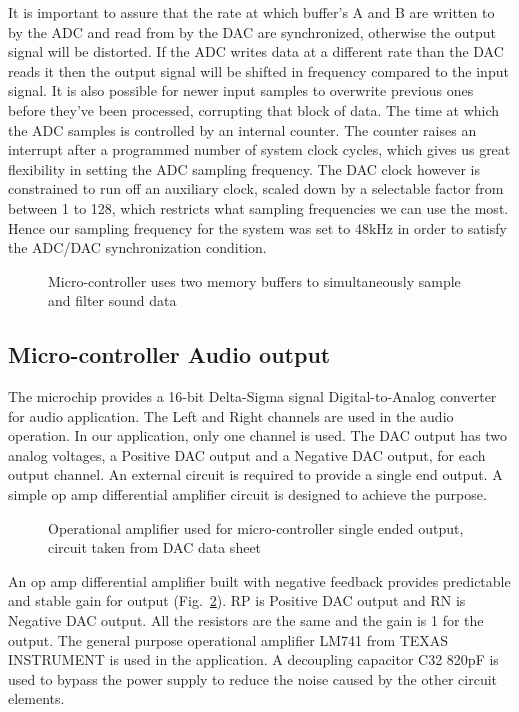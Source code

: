 It is important to assure that the rate at which buffer's A and B are written to by the ADC and read from by the DAC are synchronized, otherwise the output signal will be distorted. If the ADC writes data at a different rate than the DAC reads it then the output signal will be shifted in frequency compared to the input signal. It is also possible for newer input samples to overwrite previous ones before they've been processed, corrupting that block of data. The time at which the ADC samples is controlled by an internal counter. The counter raises an interrupt after a programmed number of system clock cycles, which gives us great flexibility in setting the ADC sampling frequency. The DAC clock however is constrained to run off an auxiliary clock, scaled down by a selectable factor from between 1 to 128, which restricts what sampling frequencies we can use the most. Hence our sampling frequency for the system was set to 48kHz in order to satisfy the ADC/DAC synchronization condition.

\begin{figure}[!htb]
	\centering
	\caption{Micro-controller uses two memory buffers to simultaneously sample and filter sound data}
	\label{fig:mcu_operation}
\end{figure}



\subsection{Micro-controller Audio output}
The microchip provides a 16-bit Delta-Sigma signal Digital-to-Analog converter for audio application.  The Left and Right channels are used in the audio operation. In our application, only one channel is used. The DAC output has two analog voltages, a Positive DAC output and a Negative DAC output, for each output channel.  An external circuit is required to provide a single end output.  A simple op amp differential amplifier circuit is designed to achieve the purpose. 

\begin{figure}[!htb]
	\centering
	\caption{Operational amplifier used for micro-controller single ended output, circuit taken from DAC data sheet\cite{DAC_datasheet}}
	\label{fig:dac_output}
\end{figure}

An op amp differential amplifier built with negative feedback provides predictable and stable gain for output (Fig.~\ref{fig:dac_output}). RP is Positive DAC output and RN is Negative DAC output.  All the resistors are the same and the gain is 1 for the output.  The general purpose operational amplifier LM741 from TEXAS INSTRUMENT is used in the application. A decoupling capacitor C32 820pF is used to bypass the power supply to reduce the noise caused by the other circuit elements. 


